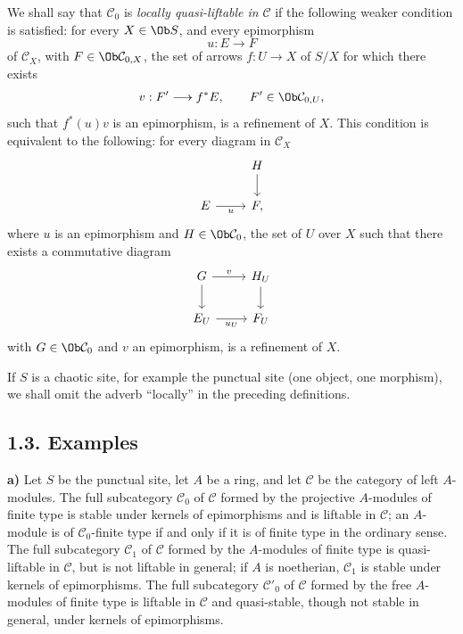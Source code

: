 \documentclass[11pt]{article}
\begin{document}
We shall say that \(\mathcal C_0\) is \emph{locally quasi-liftable in} \(\mathcal C\) if the following weaker condition is satisfied: for every \(X\in\Ob S\), and every epimorphism
\[
  u:E\longrightarrow F
\]
of \(\mathcal C_X\), with \(F\in\Ob\mathcal C_{0,X}\), the set of arrows \(f:U\to X\) of \(S/X\) for which there exists
\[
  v:F'\longrightarrow f^*E,\qquad F'\in\Ob\mathcal C_{0,U},
\]
such that \(f^*(u)v\) is an epimorphism, is a refinement of \(X\). This condition is equivalent to the following: for every diagram in \(\mathcal C_X\)
\[
\begin{tikzcd}
& H \arrow[d]\\
E \arrow[r,"u"'] & F ,
\end{tikzcd}
\]
where \(u\) is an epimorphism and \(H\in\Ob\mathcal C_0\), the set of \(U\) over \(X\) such that there exists a commutative diagram
\[
\begin{tikzcd}
G \arrow[r,"v"] \arrow[d] & H_U \arrow[d]\\
E_U \arrow[r,"u_U"'] & F_U
\end{tikzcd}
\]
with \(G\in\Ob\mathcal C_0\) and \(v\) an epimorphism, is a refinement of \(X\).

If \(S\) is a chaotic site, for example the punctual site (one object, one morphism), we shall omit the adverb ``locally'' in the preceding definitions.

\subsection*{1.3. Examples}

\textbf{a)} Let \(S\) be the punctual site, let \(A\) be a ring, and let \(\mathcal C\) be the category of left \(A\)-modules. The full subcategory \(\mathcal C_0\) of \(\mathcal C\) formed by the projective \(A\)-modules of finite type is stable under kernels of epimorphisms and is liftable in \(\mathcal C\); an \(A\)-module is of \(\mathcal C_0\)-finite type if and only if it is of finite type in the ordinary sense. The full subcategory \(\mathcal C_1\) of \(\mathcal C\) formed by the \(A\)-modules of finite type is quasi-liftable in \(\mathcal C\), but is not liftable in general; if \(A\) is noetherian, \(\mathcal C_1\) is stable under kernels of epimorphisms. The full subcategory \(\mathcal C'_0\) of \(\mathcal C\) formed by the free \(A\)-modules of finite type is liftable in \(\mathcal C\) and quasi-stable, though not stable in general, under kernels of epimorphisms.
\end{document}
